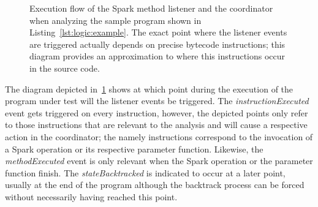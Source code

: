\begin{figure}[t]
	\caption[Execution flow of the Spark Method Listener and Coordinator]{Execution flow of the Spark method listener and the coordinator when analyzing the sample program shown in Listing~\ref{lst:logic:example}. The exact point where the listener events are triggered actually depends on precise bytecode instructions; this diagram provides an approximation to where this instructions occur in the source code.}
	\label{fig:listener:flow-diagram}
\end{figure}

The diagram depicted in~\ref{fig:listener:flow-diagram} shows at which point during the execution of the program under test will the listener events be triggered. The \textit{instructionExecuted} event gets triggered on every instruction, however, the depicted points only refer to those instructions that are relevant to the analysis and will cause a respective action in the coordinator; the namely instructions correspond to the invocation of a Spark operation or its respective parameter function. Likewise, the \textit{methodExecuted} event is only relevant when the Spark operation or the parameter function finish. The \textit{stateBacktracked} is indicated to occur at a later point, usually at the end of the program although the backtrack process can be forced without necessarily having reached this point.